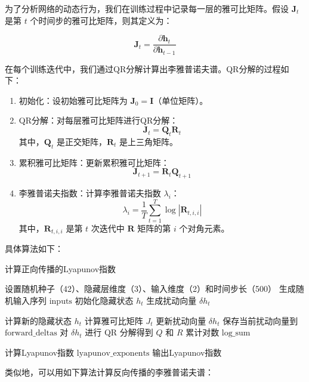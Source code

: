 为了分析网络的动态行为，我们在训练过程中记录每一层的雅可比矩阵。假设 \(\mathbf{J}_t\) 是第 \(t\) 个时间步的雅可比矩阵，则其定义为：

\[
\mathbf{J}_t = \frac{\partial \mathbf{h}_t}{\partial \mathbf{h}_{t-1}}
\]

在每个训练迭代中，我们通过QR分解计算出李雅普诺夫谱。QR分解的过程如下：

\begin{enumerate}


\item 初始化：设初始雅可比矩阵为 \(\mathbf{J}_0 = \mathbf{I}\)（单位矩阵）。
\item QR分解：对每层雅可比矩阵进行QR分解：
   \[
   \mathbf{J}_t = \mathbf{Q}_t \mathbf{R}_t
   \]
   其中，\(\mathbf{Q}_t\) 是正交矩阵，\(\mathbf{R}_t\) 是上三角矩阵。
\item 累积雅可比矩阵：更新累积雅可比矩阵：
   \[
   \mathbf{J}_{t+1} = \mathbf{R}_t \mathbf{Q}_{t+1}
   \]
\item 李雅普诺夫指数：计算李雅普诺夫指数 \(\lambda_i\)：
   \[
   \lambda_i = \frac{1}{T} \sum_{t=1}^T \log |\mathbf{R}_{t,i,i}|
   \]
   其中，\(\mathbf{R}_{t,i,i}\) 是第 \(t\) 次迭代中 \(\mathbf{R}\) 矩阵的第 \(i\) 个对角元素。

\end{enumerate}

具体算法如下：

\begin{algorithm}
   \caption{计算正向传播的Lyapunov指数}
   \begin{algorithmic}[1]
      \STATE 设置随机种子（42）、隐藏层维度（3）、输入维度（2）和时间步长（500）
      \STATE 生成随机输入序列 $\text{inputs}$
      \STATE 初始化隐藏状态 $h_t$
      \STATE 生成扰动向量 $\delta h_t$

            \STATE 计算新的隐藏状态 $h_t$
            \STATE 计算雅可比矩阵 $J_t$
            \STATE 更新扰动向量 $\delta h_t$
            \STATE 保存当前扰动向量到 $\text{forward\_deltas}$
            \STATE 对 $\delta h_t$ 进行 QR 分解得到 $Q$ 和 $R$
            \STATE 累计对数 $\text{log\_sum}$
      \ENDFOR

      \STATE 计算Lyapunov指数 $\text{lyapunov\_exponents}$
      \STATE 输出Lyapunov指数
   \end{algorithmic}
\end{algorithm}

类似地，可以用如下算法计算反向传播的李雅普诺夫谱：

